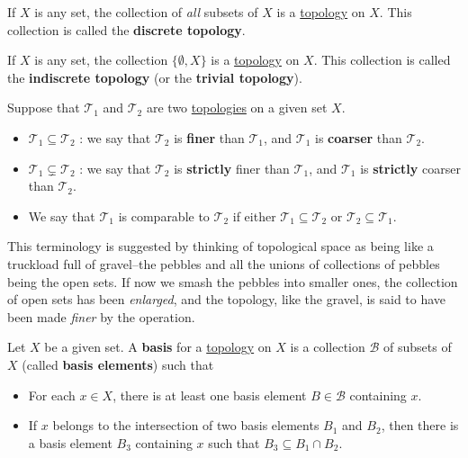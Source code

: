 If $X$ is any set, the collection of \textit{all} subsets of $X$ is a
\href{cc8eb8b}{topology} on $X$. This collection is called the \textbf{discrete
topology}.

\label{fae8227}

If $X$ is any set, the collection $\{\emptyset,X\}$ is a
\href{cc8eb8b}{topology} on $X$. This collection is called the
\textbf{indiscrete topology} (or the \textbf{trivial topology}).

\label{e04d168}

Suppose that $\mathcal T_1$ and $\mathcal T_2$ are two
\href{cc8eb8b}{topologies} on a given set $X$.

\begin{itemize}
  \def\T{\mathcal T}
  \item $\T_1\subseteq\T_2$ : we say that $\T_2$ is \textbf{finer} than $\T_1$,
        and $\T_1$ is \textbf{coarser} than $\T_2$.
  \item $\T_1\subsetneq\T_2$ : we say that $\T_2$ is \textbf{strictly} finer
        than $\T_1$, and $\T_1$ is \textbf{strictly} coarser than $\T_2$.
  \item We say that $\mathcal T_1$ is comparable to $\mathcal T_2$ if either
        $\mathcal T_1\subseteq\mathcal T_2$ or $\mathcal T_2\subseteq\mathcal
        T_1$.
\end{itemize}

This terminology is suggested by thinking of topological space as being like a
truckload full of gravel–the pebbles and all the unions of collections of
pebbles being the open sets. If now we smash the pebbles into smaller ones, the
collection of open sets has been \textit{enlarged}, and the topology, like the
gravel, is said to have been made \textit{finer} by the operation.

\label{e896402}

Let $X$ be a given set. A \textbf{basis} for a \href{cc8eb8b}{topology} on $X$
is a collection $\mathcal B$ of subsets of $X$ (called \textbf{basis elements})
such that
\begin{itemize}
  \item For each $x\in X$, there is at least one basis element $B\in\mathcal B$
        containing $x$.
  \item If $x$ belongs to the intersection of two basis elements $B_1$ and
        $B_2$, then there is a basis element $B_3$ containing $x$ such that
        $B_3\subseteq B_1\cap B_2$.
\end{itemize}

